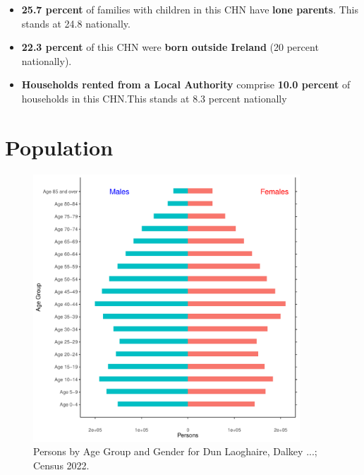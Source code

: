 \documentclass{article}
\begin{document}
\begin{itemize}
\item \textbf{25.7 percent} of families with children in this CHN have \textbf{lone parents}. This stands at 24.8 nationally.

\item \textbf{22.3 percent} of this CHN were \textbf{born outside Ireland} (20 percent nationally).

\item \textbf{Households rented from a Local Authority} comprise \textbf{10.0 percent} of households in this CHN.This stands at 8.3 percent nationally

\end{itemize}

\pagebreak

\section{Population} 
\label{sect:Pop}

\begin{figure}[h]
	\centering
	\includegraphics[width = 100mm]{../figures/PyramidPlot.pdf}
	\caption{Persons by Age Group and Gender for Dun Laoghaire, Dalkey ...; Census 2022.}
	\label{fig:2ae19629-1a6a-13a3-e055-000000000001}
	\end{figure}
\end{document}
